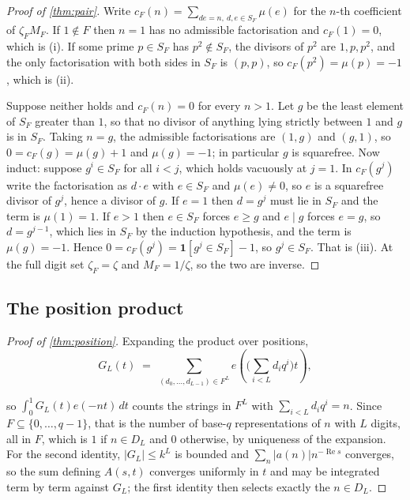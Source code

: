 \documentclass[11pt]{amsart}
\theoremstyle{definition}
\theoremstyle{remark}
\begin{document}
\begin{proof}[Proof of \cref{thm:pair}]
Write $c_{F}(n) = \sum_{de = n,\ d,e \in S_{F}} \mu(e)$ for the $n$-th coefficient of $\zeta_{F}M_{F}$. If $1 \notin F$ then $n = 1$ has no admissible factorisation and $c_{F}(1) = 0$, which is (i). If some prime $p \in S_{F}$ has $p^{2} \notin S_{F}$, the divisors of $p^{2}$ are $1, p, p^{2}$, and the only factorisation with both sides in $S_{F}$ is $(p,p)$, so $c_{F}(p^{2}) = \mu(p) = -1$, which is (ii).

Suppose neither holds and $c_{F}(n) = 0$ for every $n > 1$. Let $g$ be the least element of $S_{F}$ greater than $1$, so that no divisor of anything lying strictly between $1$ and $g$ is in $S_{F}$. Taking $n = g$, the admissible factorisations are $(1,g)$ and $(g,1)$, so $0 = c_{F}(g) = \mu(g) + 1$ and $\mu(g) = -1$; in particular $g$ is squarefree. Now induct: suppose $g^{i} \in S_{F}$ for all $i < j$, which holds vacuously at $j = 1$. In $c_{F}(g^{j})$ write the factorisation as $d \cdot e$ with $e \in S_{F}$ and $\mu(e) \ne 0$, so $e$ is a squarefree divisor of $g^{j}$, hence a divisor of $g$. If $e = 1$ then $d = g^{j}$ must lie in $S_{F}$ and the term is $\mu(1) = 1$. If $e > 1$ then $e \in S_{F}$ forces $e \ge g$ and $e \mid g$ forces $e = g$, so $d = g^{j-1}$, which lies in $S_{F}$ by the induction hypothesis, and the term is $\mu(g) = -1$. Hence $0 = c_{F}(g^{j}) = \mathbf{1}[g^{j} \in S_{F}] - 1$, so $g^{j} \in S_{F}$. That is (iii). At the full digit set $\zeta_{F} = \zeta$ and $M_{F} = 1/\zeta$, so the two are inverse.
\end{proof}

\subsection{The position product}
\label{sub:proof-position}

\begin{proof}[Proof of \cref{thm:position}]
Expanding the product over positions,
\[
  G_{L}(t) \;=\; \sum_{(d_{0},\dots,d_{L-1}) \in F^{L}} e\!\left(\Big(\sum_{i<L} d_{i} q^{i}\Big) t\right),
\]
\begin{sloppypar}
so $\int_{0}^{1} G_{L}(t)e(-nt)\,dt$ counts the strings in $F^{L}$ with $\sum_{i<L} d_{i}q^{i} = n$. Since $F \subseteq \{0,\dots,q-1\}$, that is the number of base-$q$ representations of $n$ with $L$ digits, all in $F$, which is $1$ if $n \in D_{L}$ and $0$ otherwise, by uniqueness of the expansion. For the second identity, $|G_{L}| \le k^{L}$ is bounded and $\sum_{n} |a(n)| n^{-\operatorname{Re} s}$ converges, so the sum defining $A(s,t)$ converges uniformly in $t$ and may be integrated term by term against $G_{L}$; the first identity then selects exactly the $n \in D_{L}$.
\end{sloppypar}
\end{proof}
\end{document}
